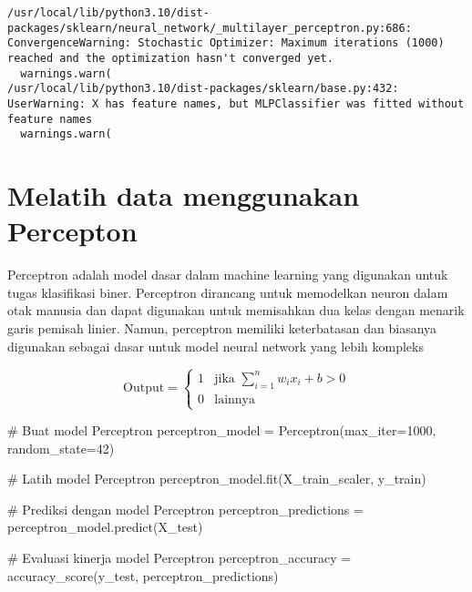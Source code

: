\documentclass[
  letterpaper,
]{krantz}
\makeatletter
\newenvironment{Shaded}{\begin{snugshade}}{\end{snugshade}}
\newcommand{\CommentTok}[1]{\textcolor[rgb]{0.37,0.37,0.37}{#1}}
\newcommand{\DecValTok}[1]{\textcolor[rgb]{0.68,0.00,0.00}{#1}}
\newcommand{\NormalTok}[1]{\textcolor[rgb]{0.00,0.23,0.31}{#1}}
\newcommand{\OperatorTok}[1]{\textcolor[rgb]{0.37,0.37,0.37}{#1}}
\newenvironment{kframe}{%
\medskip{}
\setlength{\fboxsep}{.8em}
 \def\at@end@of@kframe{}%
 \ifinner\ifhmode%
  \def\at@end@of@kframe{\end{minipage}}%
  \begin{minipage}{\columnwidth}%
 \fi\fi%
 \def\FrameCommand##1{\hskip\@totalleftmargin \hskip-\fboxsep
 \colorbox{shadecolor}{##1}\hskip-\fboxsep
     \hskip-\linewidth \hskip-\@totalleftmargin \hskip\columnwidth}%
 \MakeFramed {\advance\hsize-\width
   \@totalleftmargin\z@ \linewidth\hsize
   \@setminipage}}%
 {\par\unskip\endMakeFramed%
 \at@end@of@kframe}
\renewenvironment{Shaded}{\begin{kframe}}{\end{kframe}}
\makeatother
\begin{document}
\begin{verbatim}
/usr/local/lib/python3.10/dist-packages/sklearn/neural_network/_multilayer_perceptron.py:686: ConvergenceWarning: Stochastic Optimizer: Maximum iterations (1000) reached and the optimization hasn't converged yet.
  warnings.warn(
/usr/local/lib/python3.10/dist-packages/sklearn/base.py:432: UserWarning: X has feature names, but MLPClassifier was fitted without feature names
  warnings.warn(
\end{verbatim}

\hypertarget{melatih-data-menggunakan-percepton-1}{%
\section{Melatih data menggunakan
Percepton}\label{melatih-data-menggunakan-percepton-1}}

Perceptron adalah model dasar dalam machine learning yang digunakan
untuk tugas klasifikasi biner. Perceptron dirancang untuk memodelkan
neuron dalam otak manusia dan dapat digunakan untuk memisahkan dua kelas
dengan menarik garis pemisah linier. Namun, perceptron memiliki
keterbatasan dan biasanya digunakan sebagai dasar untuk model neural
network yang lebih kompleks

\[
\text{Output} = \begin{cases}
1 & \text{jika } \sum_{i=1}^{n} w_i x_i + b > 0 \\
0 & \text{lainnya}
\end{cases}
\]

\begin{Shaded}
\begin{Highlighting}[]

\CommentTok{\# Buat model Perceptron}
\NormalTok{perceptron\_model }\OperatorTok{=}\NormalTok{ Perceptron(max\_iter}\OperatorTok{=}\DecValTok{1000}\NormalTok{, random\_state}\OperatorTok{=}\DecValTok{42}\NormalTok{)}

\CommentTok{\# Latih model Perceptron}
\NormalTok{perceptron\_model.fit(X\_train\_scaler, y\_train)}

\CommentTok{\# Prediksi dengan model Perceptron}
\NormalTok{perceptron\_predictions }\OperatorTok{=}\NormalTok{ perceptron\_model.predict(X\_test)}

\CommentTok{\# Evaluasi kinerja model Perceptron}
\NormalTok{perceptron\_accuracy }\OperatorTok{=}\NormalTok{ accuracy\_score(y\_test, perceptron\_predictions)}
\end{Highlighting}
\end{Shaded}
\end{document}
